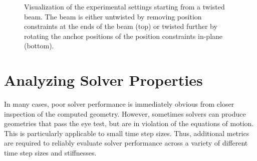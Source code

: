\begin{figure}[tb]
    \centering
    \caption{Visualization of the experimental settings starting from a twisted beam. The beam is either untwisted by removing position constraints at the 
    ends of the beam (top) or twisted further by rotating the anchor positions of the position constraints in-plane (bottom).}
    \label{fig:twisting-beam-setup}
\end{figure}

\section{Analyzing Solver Properties}\label{ss:analysis-solvers}
In many cases, poor solver performance is immediately obvious from closer inspection of the computed geometry. However, sometimes solvers can produce geometries 
that pass the eye test, but are in violation of the equations of motion. This is particularly applicable to small time step sizes. Thus, additional metrics are 
required to reliably evaluate solver performance across a variety of different time step sizes and stiffnesses. 

